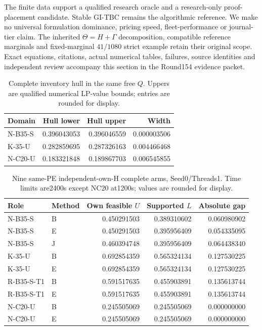 The finite data support a qualified research oracle and a research-only
proof-placement candidate. Stable GI-TBC remains the algorithmic reference.
We make no universal formulation dominance, pricing speed, fleet-performance
or journal-tier claim. The inherited $\Theta=H+\Gamma$ decomposition,
compatible reference marginals and fixed-marginal $41/1080$ strict example
retain their original scope. Exact equations, citations, actual numerical
tables, failures, source identities and independent review accompany this
section in the Round154 evidence packet.

\begin{table}[ht]
\centering
\begin{tabular}{lrrr}
Domain & Hull lower & Hull upper & Width \\ \hline
N-B35-S & 0.396043053 & 0.396046559 & 0.000003506 \\
K-35-U & 0.282859695 & 0.287326163 & 0.004466468 \\
N-C20-U & 0.183321848 & 0.189867703 & 0.006545855 \\
\end{tabular}
\caption{Complete inventory hull in the same free $Q$. Uppers are qualified numerical LP-value bounds; entries are rounded for display.}
\end{table}

\begin{table}[ht]
\centering
\begin{tabular}{llrrr}
Role & Method & Own feasible $U$ & Supported $L$ & Absolute gap \\ \hline
N-B35-S & B & 0.450291503 & 0.389310602 & 0.060980902 \\
N-B35-S & E & 0.450291503 & 0.395956409 & 0.054335095 \\
N-B35-S & J & 0.460394748 & 0.395956409 & 0.064438340 \\
K-35-U & B & 0.692854359 & 0.565324134 & 0.127530225 \\
K-35-U & E & 0.692854359 & 0.565324134 & 0.127530225 \\
R-B35-S-T1 & B & 0.591517635 & 0.455903891 & 0.135613744 \\
R-B35-S-T1 & E & 0.591517635 & 0.455903891 & 0.135613744 \\
N-C20-U & B & 0.245505069 & 0.245505069 & 0.000000000 \\
N-C20-U & E & 0.245505069 & 0.245505069 & 0.000000000 \\
\end{tabular}
\caption{Nine same-PE independent-own-H complete arms, Seed0/Threads1. Time limits are2400s except NC20 at1200s; values are rounded for display.}
\end{table}
